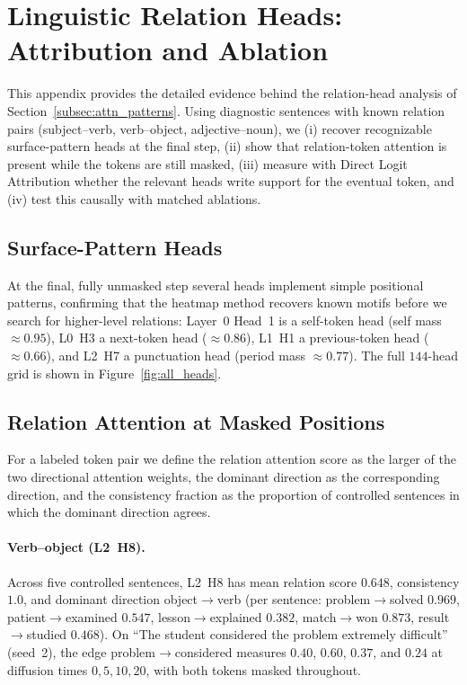 \documentclass{article} %
\begin{document}
\section{Linguistic Relation Heads: Attribution and Ablation}
\label{app:relation_heads}

This appendix provides the detailed evidence behind the relation-head analysis of Section~\ref{subsec:attn_patterns}. Using diagnostic sentences with known relation pairs (subject--verb, verb--object, adjective--noun), we (i) recover recognizable surface-pattern heads at the final step, (ii) show that relation-token attention is present while the tokens are still masked, (iii) measure with Direct Logit Attribution whether the relevant heads write support for the eventual token, and (iv) test this causally with matched ablations.

\subsection{Surface-Pattern Heads}
At the final, fully unmasked step several heads implement simple positional patterns, confirming that the heatmap method recovers known motifs before we search for higher-level relations: Layer~0 Head~1 is a self-token head (self mass $\approx 0.95$), L0~H3 a next-token head ($\approx 0.86$), L1~H1 a previous-token head ($\approx 0.66$), and L2~H7 a punctuation head (period mass $\approx 0.77$). The full $144$-head grid is shown in Figure~\ref{fig:all_heads}.

\subsection{Relation Attention at Masked Positions}
For a labeled token pair we define the relation attention score as the larger of the two directional attention weights, the dominant direction as the corresponding direction, and the consistency fraction as the proportion of controlled sentences in which the dominant direction agrees.

\paragraph{Verb--object (L2~H8).} Across five controlled sentences, L2~H8 has mean relation score $0.648$, consistency $1.0$, and dominant direction object$\to$verb (per sentence: problem$\to$solved $0.969$, patient$\to$examined $0.547$, lesson$\to$explained $0.382$, match$\to$won $0.873$, result$\to$studied $0.468$). On ``The student considered the problem extremely difficult'' (seed~2), the edge problem$\to$considered measures $0.40$, $0.60$, $0.37$, and $0.24$ at diffusion times $0,5,10,20$, with both tokens masked throughout.
\end{document}
